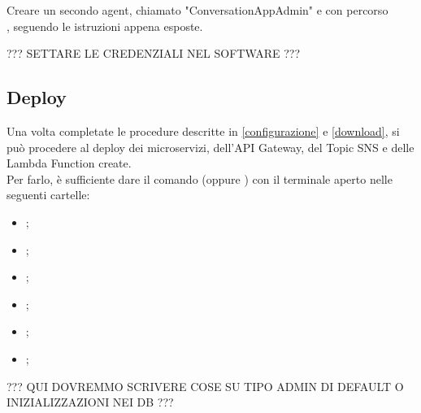 Creare un secondo agent, chiamato "ConversationAppAdmin" e con percorso\\ , seguendo le istruzioni appena esposte.

??? SETTARE LE CREDENZIALI NEL SOFTWARE ???


\subsection{Deploy}
Una volta completate le procedure descritte in \ref{configurazione} e \ref{download}, si può procedere al deploy dei microservizi, dell'API Gateway, del Topic SNS e delle Lambda Function create.\\
Per farlo, è sufficiente dare il comando  (oppure ) con il terminale aperto nelle seguenti cartelle:
\begin{itemize}
	\item {};
	\item {};
	\item {};
	\item {};
	\item {};
	\item {};
\end{itemize}

??? QUI DOVREMMO SCRIVERE COSE SU TIPO ADMIN DI DEFAULT O INIZIALIZZAZIONI NEI DB ???